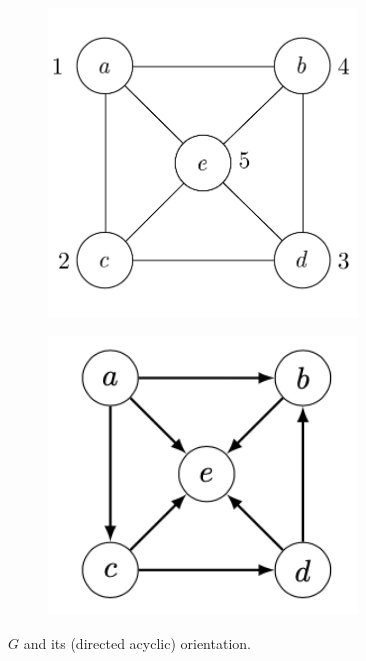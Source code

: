 \begin{figure}
  \centering
  \begin{subfigure}{0.4\textwidth}
  \includegraphics[width=0.9\textwidth]{graphics_included/ordered_undirected_graph}
    \label{figure:ordered_undirected_graph_orientations:ordered_undirected_graph}
  \end{subfigure}
  \begin{subfigure}{0.4\textwidth}
    \includegraphics[width=0.9\textwidth]{graphics_included/directed_ordered_undirected_graph}
    	\label{figure:ordered_undirected_graph_orientations:directed_ordered_undirected_graph}
  \end{subfigure}
  \caption{$G$ and its (directed acyclic) orientation.}
  \label{figure:ordered_undirected_graph_orientations:main}
\end{figure}


